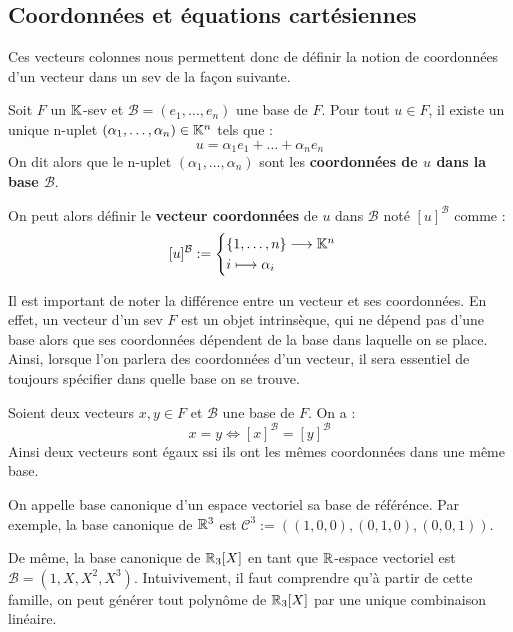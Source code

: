 \subsection{Coordonnées et équations cartésiennes}

Ces vecteurs colonnes nous permettent donc de définir la notion de coordonnées d'un vecteur dans un sev de la façon suivante. 

\begin{definition}[Coordonnées]
    Soit $F$ un $\mathbb{K}$-sev et $ \mathcal{B} = (e_1, \dots , e_n)$ une base de $F$. 
    Pour tout $u \in F$, il existe un unique n-uplet $( \alpha_1, \dots , \alpha_n) \in \mathbb{K}^n$ tels que : 
        \[ u = \alpha_1 e_1 + \dots + \alpha_n e_n \] 
    On dit alors que le n-uplet $( \alpha_1, \dots , \alpha_n)$ sont les \textbf{coordonnées de $u$ dans la base $ \mathcal{B}$}. 

    \vspace{0.3cm}

    On peut alors définir le \textbf{vecteur coordonnées} de $u$ dans $ \mathcal{B}$ noté $[u]^{ \mathcal{B}}$ comme : 
    \[ [u]^{ \mathcal{B}} := 
        \begin{cases}
            \{1, \dots , n\} \longrightarrow \mathbb{K}^n \\ 
            i \longmapsto \alpha_i 
        \end{cases} \] 
\end{definition}

Il est important de noter la différence entre un vecteur et ses coordonnées. En effet, un vecteur d'un sev $F$ est 
un objet intrinsèque, qui ne dépend pas d'une base alors que ses coordonnées dépendent de la base 
dans laquelle on se place.  
Ainsi, lorsque l'on parlera des coordonnées d'un vecteur, il sera essentiel de toujours spécifier dans quelle 
base on se trouve. 

\begin{proposition}
    Soient deux vecteurs $x, y \in F$ et $ \mathcal{B}$ une base de $F$. On a : 
        \[ x = y \iff [x]^{ \mathcal{B}} = [y]^{ \mathcal{B}} \] 
    Ainsi deux vecteurs sont égaux ssi ils ont les mêmes coordonnées dans une même base. 
\end{proposition}

\begin{remark}
    On appelle base canonique d'un espace vectoriel sa base de référénce. 
    Par exemple, la base canonique de $\mathbb{R}^3$ est $ \mathcal{C}^3 := ((1,0,0), (0,1,0), (0,0,1))$. 
    
    De même, la base canonique de $\mathbb{R}_3[X]$ en tant que $\mathbb{R}$-espace vectoriel est $ \mathcal{B} = (1, X, X^2, X^3)$. 
    Intuivivement, il faut comprendre qu'à partir de cette famille, on peut générer tout polynôme de $\mathbb{R}_3[X]$ 
    par une unique combinaison linéaire. 
\end{remark}

